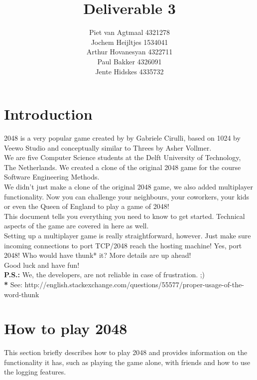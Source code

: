 \documentclass[a4paper,11pt,report]{scrartcl}
\title{\huge\textbf{Deliverable 3}}
\author{Piet van Agtmaal 4321278\\
	    Jochem Heijltjes 1534041\\
		Arthur Hovanesyan 4322711\\
		Paul Bakker 4326091\\
		Jente Hidskes 4335732
	   }
\begin{document}
\begin{titlepage}
\maketitle
\thispagestyle{empty} %
\end{titlepage}

\newpage\section{Introduction}

2048 is a very popular game created by by Gabriele Cirulli, based on 1024 by
Veewo Studio and conceptually similar to Threes by Asher Vollmer.\\

We are five Computer Science students at the Delft University of Technology,
The Netherlands. We created a clone of the original 2048 game for the course
Software Engineering Methods.\\

We didn't just make a clone of the original 2048 game, we also added
multiplayer functionality. Now you can challenge your neighbours, your
coworkers, your kids or even the Queen of England to play a game of 2048!\\

This document tells you everything you need to know to get started. Technical aspects of
the game are covered in here as well.\\

Setting up a multiplayer game is really straightforward, however. Just make sure incoming connections to port TCP/2048 reach the hosting machine! Yes, port 2048! Who would have thunk* it? More details are up ahead!\\

Good luck and have fun!\\

\textbf{P.S.:} We, the developers, are not reliable in case of frustration. ;)\\

\textbf{*} See: http://english.stackexchange.com/questions/55577/proper-usage-of-the-word-thunk

\newpage\section{How to play 2048}

This section briefly describes how to play 2048 and provides information on
the functionality it has, such as playing the game alone, with friends and how
to use the logging features.\\
\end{document}
